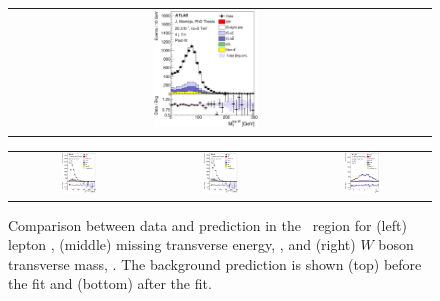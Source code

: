 \begin{figure}[tp]
\begin{tabular}{ccc}
  \includegraphics[width=0.27\textwidth]{Analysis/Figures_ttH/tesis_vars/postfit/WlepMT_4jetex3btagex.eps} \\
\end{tabular}
\caption{Comparison between data and prediction in the \fourthree\ region for (left) lepton \pt,  (middle) missing transverse energy, \met, and (right)  $W$ boson transverse mass, \mtw. The background prediction is shown (top) before the fit and (bottom) after the fit.}
  \label{fig:vars1_fourthree}
\vspace{0.5cm}
  \centering
  \begin{tabular}{ccc}
  \includegraphics[width=0.27\textwidth]{Analysis/Figures_ttH/tesis_vars/prefit/jet1_pt_4jetex3btagex.eps} &
  \includegraphics[width=0.27\textwidth]{Analysis/Figures_ttH/tesis_vars/prefit/bjet1_pt_4jetex3btagex.eps} &
  \includegraphics[width=0.27\textwidth]{Analysis/Figures_ttH/tesis_vars/prefit/lep_eta_4jetex3btagex.eps} \\

\end{tabular}
\end{figure}
